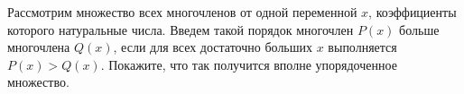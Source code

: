 Рассмотрим множество всех многочленов от одной переменной $x$, коэффициенты которого натуральные
числа. Введем такой порядок многочлен $P(x)$ больше многочлена $Q(x)$, если для всех достаточно больших
$x$ выполняется $P(x) > Q(x)$. Покажите, что так получится вполне упорядоченное множество.
